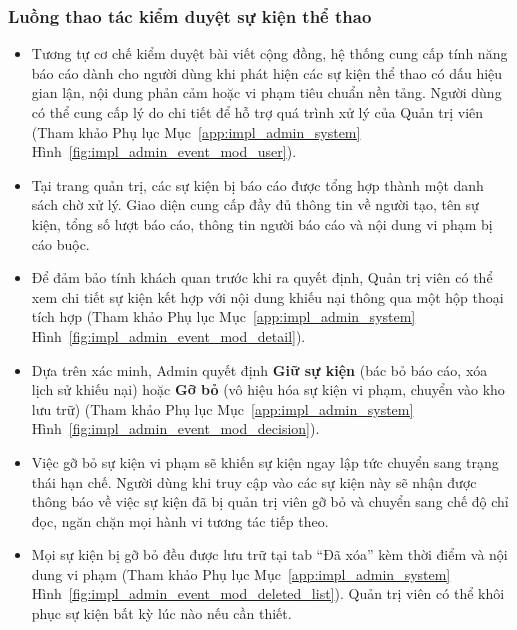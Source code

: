 \subsubsection{Luồng thao tác kiểm duyệt sự kiện thể thao}
\begin{itemize}
    \item Tương tự cơ chế kiểm duyệt bài viết cộng đồng, hệ thống cung cấp tính năng báo cáo dành cho người dùng khi phát hiện các sự kiện thể thao có dấu hiệu gian lận, nội dung phản cảm hoặc vi phạm tiêu chuẩn nền tảng. Người dùng có thể cung cấp lý do chi tiết để hỗ trợ quá trình xử lý của Quản trị viên (Tham khảo Phụ lục Mục~\ref{app:impl_admin_system} Hình~\ref{fig:impl_admin_event_mod_user}).


    \item Tại trang quản trị, các sự kiện bị báo cáo được tổng hợp thành một danh sách chờ xử lý. Giao diện cung cấp đầy đủ thông tin về người tạo, tên sự kiện, tổng số lượt báo cáo, thông tin người báo cáo và nội dung vi phạm bị cáo buộc.


    \item Để đảm bảo tính khách quan trước khi ra quyết định, Quản trị viên có thể xem chi tiết sự kiện kết hợp với nội dung khiếu nại thông qua một hộp thoại tích hợp (Tham khảo Phụ lục Mục~\ref{app:impl_admin_system} Hình~\ref{fig:impl_admin_event_mod_detail}).


    \item Dựa trên xác minh, Admin quyết định \textbf{Giữ sự kiện} (bác bỏ báo cáo, xóa lịch sử khiếu nại) hoặc \textbf{Gỡ bỏ} (vô hiệu hóa sự kiện vi phạm, chuyển vào kho lưu trữ) (Tham khảo Phụ lục Mục~\ref{app:impl_admin_system} Hình~\ref{fig:impl_admin_event_mod_decision}).


    \item Việc gỡ bỏ sự kiện vi phạm sẽ khiến sự kiện ngay lập tức chuyển sang trạng thái hạn chế. Người dùng khi truy cập vào các sự kiện này sẽ nhận được thông báo về việc sự kiện đã bị quản trị viên gỡ bỏ và chuyển sang chế độ chỉ đọc, ngăn chặn mọi hành vi tương tác tiếp theo.


    \item Mọi sự kiện bị gỡ bỏ đều được lưu trữ tại tab ``Đã xóa'' kèm thời điểm và nội dung vi phạm (Tham khảo Phụ lục Mục~\ref{app:impl_admin_system} Hình~\ref{fig:impl_admin_event_mod_deleted_list}). Quản trị viên có thể khôi phục sự kiện bất kỳ lúc nào nếu cần thiết.

\end{itemize}

